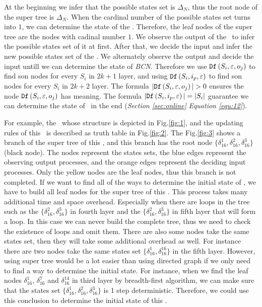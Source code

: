 At the beginning we infer that the possible states set is $\Delta_N$, thus the root node of the super tree is $\Delta_N$. When the cardinal number of the possible states set turns into $1$, we can determine the state of the \BCN. Therefore, the leaf nodes of the super tree are the nodes with cadinal number $1$. We observe the output of the \BCN\ to infer the possible states set of it at first. After that, we decide the input and infer the new possible states set of the \BCN. We alternately observe the output and decide the input untill we can determine the state of {\em BCN}. Therefore we use ${\tt Df}\left(S_i,\varepsilon, o_j\right)$ to find son nodes for every $S_i$ in $2k+1$ layer, and using ${\tt Df}\left(S_i,i_p,\varepsilon\right)$ to find son nodes for every $S_i$ in $2k+2$ layer. The formula $|\Ded\left(S_i,\varepsilon, o_j\right)|>0$ ensures the node ${\tt Df}\left(S_i,\varepsilon, o_j\right)$ has meaning. The formula $|{\tt Df}\left(S_i,i_p,\varepsilon\right)|=|S_i|$ guarantee we can determine the state of \BCN\ in the end ({\em Section \ref{sec:online}} {\em Equation \ref{equ:12}}).
\begin{example}
For example, the \BCN\ whose structure is depicted in Fig.\ref{fig:1}, and the updating rules of this \BCN\ is described as truth table in Fig.\ref{fig:2}. The Fig.\ref{fig:3} shows a branch of the super tree of this \BCN, and this branch has the root node $\{\delta_{16}^1,\delta_{16}^2,\delta_{16}^3\}$ (black node). The nodes represent the states sets, the blue edges represent the observing output processes, and the orange edges represent the deciding input processes. Only the yellow nodes are the leaf nodes, thus this branch is not completed. If we want to find all of the ways to determine the initial state of \BCN, we have to build all leaf nodes for the super tree of this \BCN. This process takes many additional time and space overhead. Especially when there are loops in the tree such as the $\{\delta_{16}^2,\delta_{16}^3\}$ in fourth layer and the $\{\delta_{16}^2,\delta_{16}^3\}$ in fifth layer that will form a loop. In this case we can never build the complete tree, thus we need to check the existence of loops and omit them. There are also some nodes take the same states set, then they will take some additional overhead as well. For instance there are two nodes take the same states set $\{\delta_{16}^1,\delta_{16}^{16}\}$ in the fifth layer. However, using super tree would be a lot easier than using directed graph if we only need to find a way to determine the initial state. For instance, when we find the leaf nodes $\delta_{16}^1$, $\delta_{16}^7$ and  $\delta_{16}^{14}$ in third layer by breadth-first algorithm, we can make sure that the states set $\{\delta_{16}^1,\delta_{16}^2,\delta_{16}^3\}$ is 1 step deterministic. Therefore, we could use this conclusion to determine the initial state of this \BCN. 
\end{example}   
